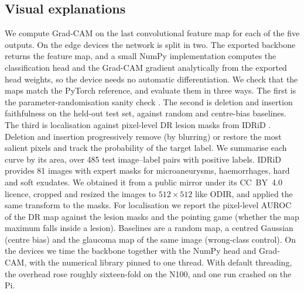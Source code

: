 \documentclass[a4paper,fleqn]{cas-sc}
\begin{document}
\subsection{Visual explanations}
\label{sec:gradcam}
We compute Grad-CAM \cite{selvaraju2017gradcam} on the last convolutional
feature map for each of the five outputs. On the edge devices the network
is split in two. The exported backbone returns the feature map, and a small
NumPy implementation computes the classification head and the Grad-CAM
gradient analytically from the exported head weights, so the device needs
no automatic differentiation. We check that the maps match the PyTorch
reference, and evaluate them in three ways. The first is the
parameter-randomisation sanity check \cite{adebayo2018sanity}. The second
is deletion and insertion faithfulness on the held-out test set, against
random and centre-bias baselines. The third is localisation against
pixel-level DR lesion masks from IDRiD \cite{porwal2018indian}.
Deletion and insertion progressively remove (by blurring) or restore the
most salient pixels and track the probability of the target label. We
summarise each curve by its area, over 485 test image--label pairs with
positive labels. IDRiD provides 81 images with expert masks for
microaneurysms, haemorrhages, hard and soft exudates. We obtained it from
a public mirror under its CC~BY~4.0 licence, cropped and resized the
images to $512\times512$ like ODIR, and applied the same transform to the
masks. For localisation we report the pixel-level AUROC of the DR map
against the lesion masks and the pointing game (whether the map maximum
falls inside a lesion). Baselines are a random map, a centred Gaussian
(centre bias) and the glaucoma map of the same image (wrong-class
control). On the devices we time the backbone together with the NumPy
head and Grad-CAM, with the numerical library pinned to one thread. With
default threading, the overhead rose roughly sixteen-fold on the N100,
and one run crashed on the Pi.
\end{document}
